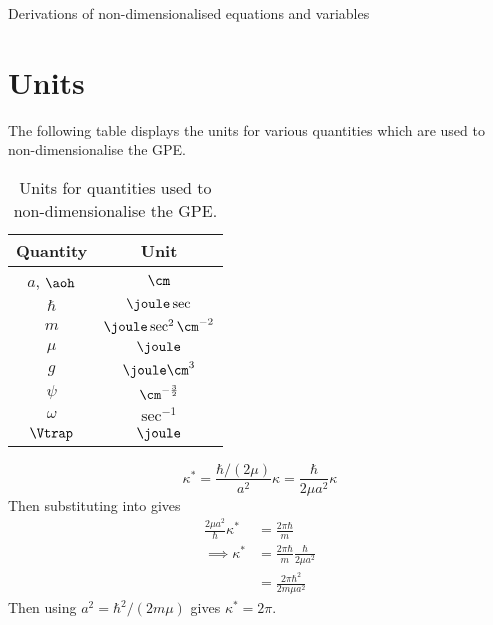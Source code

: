 
\begin{chapter}{\label{cha:nondim}Derivations of non-dimensionalised equations
and variables}
  \section{Units}
  The following table displays the units for various quantities which are used
  to non-dimensionalise the GPE.
  \begin{table}[h]
    \centering
    \begin{tabular}{|c|c|}
      \hline
      Quantity & Unit \\
      \hline
      $a$, $\aoh$ & $\cm$ \\
      $\hbar$     & $\joule\sec$ \\
      $m$         & $\joule\sec^{2}\cm^{-2}$ \\
      $\mu$       & $\joule$ \\
      $g$         & $\joule\cm^{3}$ \\
      $\psi$      & $\cm^{-\frac{3}{2}}$ \\
      $\omega$    & $\sec^{-1}$ \\
      $\Vtrap$    & $\joule$ \\
      \hline
    \end{tabular}
    \caption{Units for quantities used to non-dimensionalise the GPE.}
  \end{table}

  \begin{equation}
    \kappa^{*} = \frac{\hbar/(2\mu)}{a^{2}}\kappa = \frac{\hbar}{2\mu
      a^{2}}\kappa
    \label{eqn:two}
  \end{equation}
  Then substituting into gives
  \begin{equation*}
    \begin{aligned}
      \frac{2\mu a^{2}}{\hbar}\kappa^{*} &= \frac{2\pi\hbar}{m} \\
      \implies \kappa^{*} &= \frac{2\pi\hbar}{m} \frac{\hbar}{2\mu a^{2}} \\
      &= \frac{2\pi\hbar^{2}}{2m\mu a^{2}}
    \end{aligned}
  \end{equation*}
  Then using $a^{2} = \hbar^{2}/(2m\mu)$ gives $\kappa^{*} = 2\pi$.
\end{chapter}
